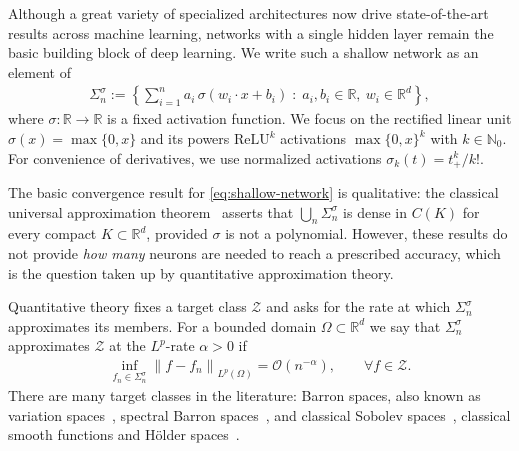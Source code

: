 \documentclass[12pt]{article}
\numberwithin{equation}{section}
\numberwithin{figure}{section}
\numberwithin{equation}{section}
\newcommand{\R}{\mathbb{R}}
\newcommand{\N}{\mathbb{N}}
\newcommand{\norm}[1]{\left\|#1\right\|}
\begin{document}
Although a great variety of specialized architectures now drive state-of-the-art 
results across machine learning, networks with a single hidden layer remain the 
basic building block of deep learning. We write 
such a shallow network as an element of
\begin{align}
    \Sigma_n^{\sigma}
    := \left\{ \sum_{i=1}^n a_i\,\sigma(w_i\cdot x+b_i)
    \;:\; a_i,b_i\in\R,\ w_i\in\R^d \right\},
    \label{eq:shallow-network}
\end{align}
where $\sigma:\R\to\R$ is a fixed activation function. We focus on the rectified
linear unit $\sigma(x)=\max\{0,x\}$ and its powers 
$\mathrm{ReLU}^k$ activations $\max\{0,x\}^k$ with $k\in\N_0$. For convenience of 
derivatives, we use normalized activations $\sigma_k(t)=t_+^k/k!$.

The basic convergence result for \eqref{eq:shallow-network} is qualitative: the
classical universal approximation
theorem~\cite{cybenko_ApproximationSuperpositionsSigmoidal_1989,%
hornik_ApproximationCapabilitiesMultilayer_1991,%
leshno_multilayerfeedforwardnetworks_1993} asserts that $\bigcup_{n}\Sigma_n^{\sigma}$
is dense in $C(K)$ for every compact $K\subset\R^d$, provided $\sigma$ is not a
polynomial. However, these results do not provide \emph{how many} neurons are
needed to reach a prescribed accuracy, which is the question taken up by quantitative
approximation theory.

Quantitative theory fixes a target class $\mathcal Z$ and asks for the rate at
which $\Sigma_n^{\sigma}$ approximates its members. For a bounded domain
$\Omega\subset\R^d$ we say that $\Sigma_n^{\sigma}$ approximates $\mathcal Z$ at
the $L^p$-rate $\alpha>0$ if
\begin{align*}
    \inf_{f_n\in\Sigma_n^{\sigma}}\norm{f-f_n}_{L^p(\Omega)}= \mathcal O(n^{-\alpha}),
    \qquad \forall f\in\mathcal Z .
\end{align*}
There are many target classes in the literature: Barron spaces, also
known as variation spaces~\cite{barron_universalapproximationbounds_1993,%
e_barronspaceflowinduced_2022,siegel_characterizationvariationspaces_2023},
spectral Barron spaces~\cite{barron_universalapproximationbounds_1993,%
klusowski_approximationcombinationsrelu_2018,siegel_HighorderApproximationRates_2022},
and classical Sobolev spaces~\cite{petrushev_approximationridgefunctions_1998,%
pinkus_approximationtheorymlp_1999,mao_ApproximationRatesShallow_2026}, 
classical smooth functions and H\"older spaces~\cite{lu_DeepNetworkApproximation_2021,%
shen_DeepNetworkApproximation_2020, shen_OptimalApproximationRate_2022}.
\end{document}
